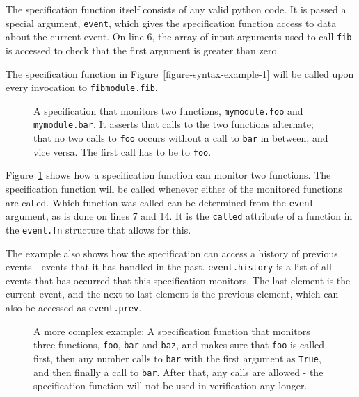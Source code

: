 \documentclass[a4paper,11pt]{kth-mag}
\begin{document}
The specification function itself consists of any valid python code. It is
passed a special argument, \texttt{event}, which gives the specification
function access to data about the current event. On line 6, the array of input
arguments used to call \texttt{fib} is accessed to check that the first
argument is greater than zero.

The specification function in Figure~\ref{figure-syntax-example-1} will be
called upon every invocation to \texttt{fibmodule.fib}.

\begin{figure}[h!]
	\begin{center}
	\begin{minipage}{0.7\textwidth}
	
	\end{minipage}
	\end{center}

	\caption{A specification that monitors two functions, \texttt{mymodule.foo}
		and \texttt{mymodule.bar}. It asserts that calls to the two functions
		alternate; that no two calls to \texttt{foo} occurs without a call to
		\texttt{bar} in between, and vice versa. The first call has to be to
		\texttt{foo}.}
	\label{figure-syntax-example-2}
\end{figure}

Figure~\ref{figure-syntax-example-2} shows how a specification function can
monitor two functions. The specification function will be called whenever
either of the monitored functions are called. Which function was called can be
determined from the \texttt{event} argument, as is done on lines 7 and 14. It
is the \texttt{called} attribute of a function in the \texttt{event.fn}
structure that allows for this.

The example also shows how the specification can access a history of previous
events - events that it has handled in the past. \texttt{event.history} is a
list of all events that has occurred that this specification monitors. The last
element is the current event, and the next-to-last element is the previous
element, which can also be accessed as \texttt{event.prev}.

\begin{figure}[h!]
	\begin{center}
	\begin{minipage}{0.7\textwidth}
	
	\end{minipage}
	\end{center}

	\caption{A more complex example: A specification function that monitors three
		functions, \texttt{foo}, \texttt{bar} and \texttt{baz}, and makes sure that
		\texttt{foo} is called first, then any number calls to \texttt{bar} with
		the first argument as \texttt{True}, and then finally a call to
	\texttt{bar}. After that, any calls are allowed - the specification function
will not be used in verification any longer.}
	\label{figure-syntax-example-3}
\end{figure}
\end{document}
